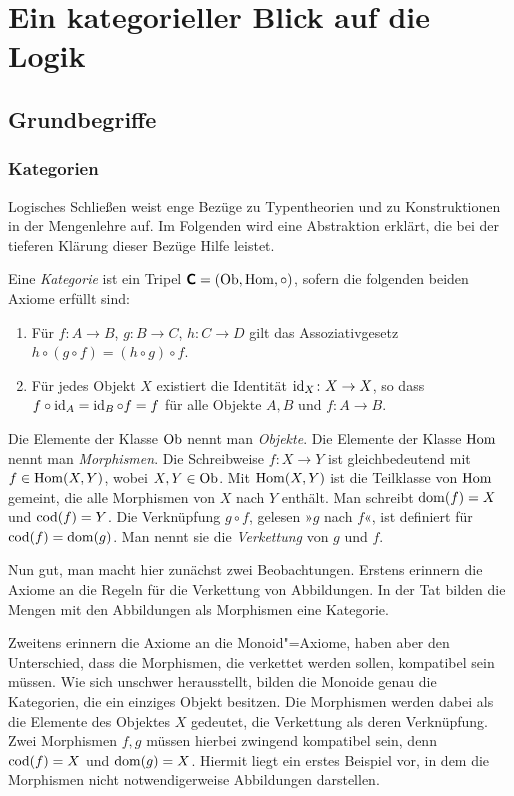 
\chapter{Ein kategorieller Blick auf die Logik\!}

\section{Grundbegriffe}

\subsection{Kategorien}

Logisches Schließen weist enge Bezüge zu Typentheorien und zu
Konstruktionen in der Mengenlehre auf. Im Folgenden wird eine
Abstraktion erklärt, die bei der tieferen Klärung dieser
Bezüge Hilfe leistet.

\begin{Definition}[Kategorie]
Eine \emph{Kategorie} ist ein Tripel $\textsf{\textbf{C}} = (\operatorname{Ob},\operatorname{Hom},{\circ})$,
sofern die folgenden beiden Axiome erfüllt sind:
\begin{enumerate}
\item Für $f\colon A\to B$, $g\colon B\to C$, $h\colon C\to D$ gilt
das Assoziativgesetz\\
$h\circ (g\circ f) = (h\circ g)\circ f$.
\item Für jedes Objekt $X$ existiert die Identität $\operatorname{id}_X\colon X\to X$,
so dass $f\circ\operatorname{id}_A = \operatorname{id}_B\circ f=f$ für alle Objekte $A,B$
und $f\colon A\to B$.
\end{enumerate}
\end{Definition}
Die Elemente der Klasse $\operatorname{Ob}$ nennt man \emph{Objekte}. Die Elemente der
Klasse $\operatorname{Hom}$ nennt man \emph{Morphismen}.  Die Schreibweise
$f\colon X\to Y$ ist gleichbedeutend mit $f\in\operatorname{Hom}(X,Y)$, wobei $X,Y\in\operatorname{Ob}$.
Mit $\operatorname{Hom}(X,Y)$ ist die Teilklasse von $\operatorname{Hom}$ gemeint, die alle
Morphismen von $X$ nach $Y$ enthält. Man schreibt $\operatorname{dom}(f) = X$ und
$\operatorname{cod}(f) = Y$. Die Verknüpfung $g\circ f$, gelesen »$g$ nach $f$«, ist
definiert für $\operatorname{cod}(f)=\operatorname{dom}(g)$. Man nennt sie die \emph{Verkettung}
von $g$ und $f$.

Nun gut, man macht hier zunächst zwei Beobachtungen. Erstens erinnern
die Axiome an die Regeln für die Verkettung von Abbildungen.
In der Tat bilden die Mengen mit den Abbildungen als Morphismen
eine Kategorie.

Zweitens erinnern die Axiome an die Monoid"=Axiome, haben aber den
Unterschied, dass die Morphismen, die verkettet werden sollen, kompatibel
sein müssen. Wie sich unschwer herausstellt, bilden die Monoide genau
die Kategorien, die ein einziges Objekt besitzen. Die Morphismen werden
dabei als die Elemente des Objektes $X$ gedeutet, die Verkettung als deren
Verknüpfung. Zwei Morphismen $f,g$ müssen hierbei zwingend kompatibel sein,
denn $\operatorname{cod}(f)=X$ und $\operatorname{dom}(g)=X$. Hiermit liegt ein erstes Beispiel vor,
in dem die Morphismen nicht notwendigerweise Abbildungen darstellen.

